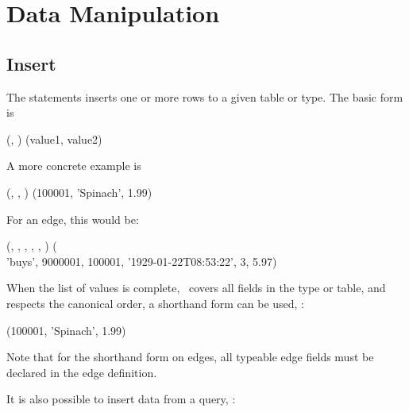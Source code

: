 \section{Data Manipulation}
\subsection{Insert}
The  statements inserts one or more rows
to a given table or type.
The basic form is

  
                      (,
                       )
                      (value1, value2)

A more concrete example is

  
                      (,
                       ,
                       )
                      (100001, 'Spinach', 1.99)

For an edge, this would be:

\begin{minipage}{\textwidth}
  
                      (,
                       ,
                       ,
                       ,
                       ,
                       )
                      (\\
                       'buys', 9000001, 100001,
                       '1929-01-22T08:53:22',
                       3, 5.97)
\end{minipage}

When the list of values is complete,
\ie\ covers all fields in the type or table,
and respects the canonical order,
a shorthand form can be used, \eg:

  
                      (100001, 'Spinach', 1.99)

Note that for the shorthand form on edges,
all typeable edge fields must be declared
in the edge definition. 

It is also possible  to insert data from
a query, \eg:

